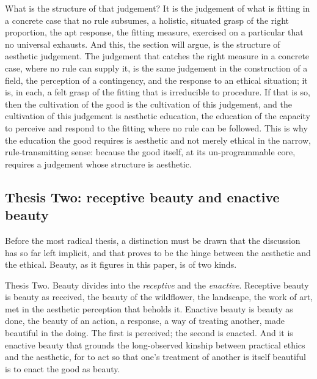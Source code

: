 What is the structure of that judgement? It is the judgement of what is fitting in a concrete case that no rule subsumes, a holistic, situated grasp of the right proportion, the apt response, the fitting measure, exercised on a particular that no universal exhausts. And this, the section will argue, is the structure of aesthetic judgement. The judgement that catches the right measure in a concrete case, where no rule can supply it, is the same judgement in the construction of a field, the perception of a contingency, and the response to an ethical situation; it is, in each, a felt grasp of the fitting that is irreducible to procedure. If that is so, then the cultivation of the good is the cultivation of this judgement, and the cultivation of this judgement is aesthetic education, the education of the capacity to perceive and respond to the fitting where no rule can be followed. This is why the education the good requires is aesthetic and not merely ethical in the narrow, rule-transmitting sense: because the good itself, at its un-programmable core, requires a judgement whose structure is aesthetic.

\subsection{Thesis Two: receptive beauty and enactive beauty}
\label{p21:sub:ae-thesis2}

Before the most radical thesis, a distinction must be drawn that the discussion has so far left implicit, and that proves to be the hinge between the aesthetic and the ethical. Beauty, as it figures in this paper, is of two kinds.

\begin{thesis}{Thesis Two.}
Beauty divides into the \emph{receptive} and the \emph{enactive}. Receptive beauty is beauty as received, the beauty of the wildflower, the landscape, the work of art, met in the aesthetic perception that beholds it. Enactive beauty is beauty as done, the beauty of an action, a response, a way of treating another, made beautiful in the doing. The first is perceived; the second is enacted. And it is enactive beauty that grounds the long-observed kinship between practical ethics and the aesthetic, for to act so that one's treatment of another is itself beautiful is to enact the good as beauty.
\end{thesis}

